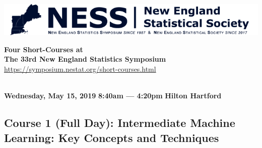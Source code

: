 \documentclass[11pt]{article}
\begin{document}
\begin{center}
\begin{minipage}[m]{3.5in}
\includegraphics[width=\linewidth]{ness-banner.png}
\end{minipage}
\hspace{0.2cm}
\begin{minipage}[m]{4in}
\begin{center}
{\bf\large Four Short-Courses at \\
  The 33rd New England Statistics Symposium}
\url{https://symposium.nestat.org/short-courses.html}
\end{center}
\end{minipage}
\\[2ex]
{\bf Wednesday, May 15, 2019} \hfill
{\bf 8:40am --- 4:20pm} \hfill
{\bf Hilton Hartford}
\end{center}


\subsection*{Course 1 (Full Day):  Intermediate Machine Learning: Key Concepts and Techniques}
\end{document}
